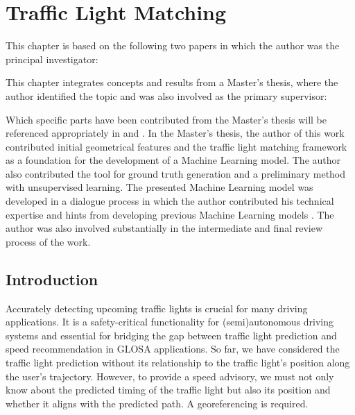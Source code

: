 \chapter{Traffic Light Matching}\label{ch:matching}

\begin{Summary}
This chapter is based on the following two papers in which the author was the principal investigator: 

\cite{matthes2022matching} 

\cite{matthes2023geo} 

This chapter integrates concepts and results from a Master's thesis, where the author identified the topic and was also involved as the primary supervisor:

\cite{jeschor_2022} 

Which specific parts have been contributed from the Master's thesis will be referenced appropriately in  and . In the Master's thesis, the author of this work contributed initial geometrical features and the traffic light matching framework as a foundation for the development of a Machine Learning model. The author also contributed the tool for ground truth generation and a preliminary method with unsupervised learning. The presented Machine Learning model was developed in a dialogue process in which the author contributed his technical expertise and hints from developing previous Machine Learning models \cite{matthes2022selecting}. The author was also involved substantially in the intermediate and final review process of the work.
\end{Summary}

\section{Introduction}

Accurately detecting upcoming traffic lights is crucial for many driving applications. It is a safety-critical functionality for (semi)autonomous driving systems and essential for bridging the gap between traffic light prediction and speed recommendation in GLOSA applications. So far, we have considered the traffic light prediction without its relationship to the traffic light's position along the user's trajectory. However, to provide a speed advisory, we must not only know about the predicted timing of the traffic light but also its position and whether it aligns with the predicted path. A georeferencing is required.

